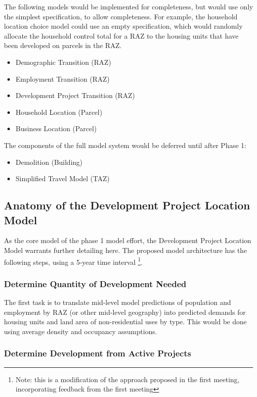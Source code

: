 The following models would be implemented for completeness, but would
use only the simplest specification, to allow completeness.  For example,
the household location choice model could use an empty specification,
which would randomly allocate the household control total for a RAZ to
the housing units that have been developed on parcels in the RAZ.

\begin{itemize}
\item Demographic Transition (RAZ)
\item Employment Transition (RAZ)
\item Development Project Transition (RAZ)
\item Household Location (Parcel)
\item Business Location (Parcel)
\end{itemize}

The components of the full model system would be deferred until after Phase 1:

\begin{itemize}
\item Demolition (Building)
\item Simplified Travel Model (TAZ)
\end{itemize}


\subsection{Anatomy of the Development Project Location Model}
As the core model of the phase 1 model effort, the Development Project Location Model warrants
further detailing here.  The proposed model architecture has the following steps, using a 5-year time interval \footnote{Note: this is a modification of the approach proposed in the first meeting,
incorporating feedback from the first meeting}.

\subsubsection{Determine Quantity of Development Needed}

The first task is to translate mid-level model predictions of population and employment by RAZ (or
other mid-level geography) into predicted demands for housing units and land area of non-residential
uses by type. This would be done using average density and occupancy assumptions.

\subsubsection{Determine Development from Active Projects}

